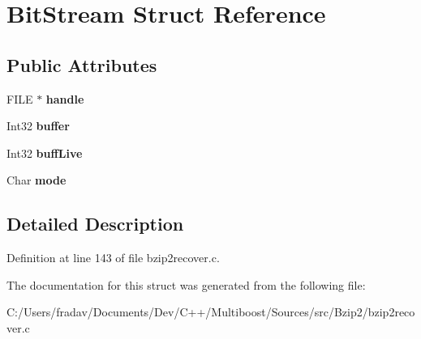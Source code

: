 \hypertarget{structBitStream}{\section{Bit\-Stream Struct Reference}
\label{structBitStream}
}
\subsection*{Public Attributes}
\begin{DoxyCompactItemize}
\item 
\hypertarget{structBitStream_a956fee2244b6911cd9d9f9d75d60a9a7}{F\-I\-L\-E $\ast$ {\bfseries handle}}\label{structBitStream_a956fee2244b6911cd9d9f9d75d60a9a7}

\item 
\hypertarget{structBitStream_a44b9819338efc572dda889f48bf0bcdb}{Int32 {\bfseries buffer}}\label{structBitStream_a44b9819338efc572dda889f48bf0bcdb}

\item 
\hypertarget{structBitStream_a0d8a427f988b0457fd82000bfbdaa341}{Int32 {\bfseries buff\-Live}}\label{structBitStream_a0d8a427f988b0457fd82000bfbdaa341}

\item 
\hypertarget{structBitStream_abca99d84aadde3a1078aa2bc9ba88659}{Char {\bfseries mode}}\label{structBitStream_abca99d84aadde3a1078aa2bc9ba88659}

\end{DoxyCompactItemize}


\subsection{Detailed Description}


Definition at line 143 of file bzip2recover.\-c.



The documentation for this struct was generated from the following file\-:\begin{DoxyCompactItemize}
\item 
C\-:/\-Users/fradav/\-Documents/\-Dev/\-C++/\-Multiboost/\-Sources/src/\-Bzip2/bzip2recover.\-c\end{DoxyCompactItemize}
